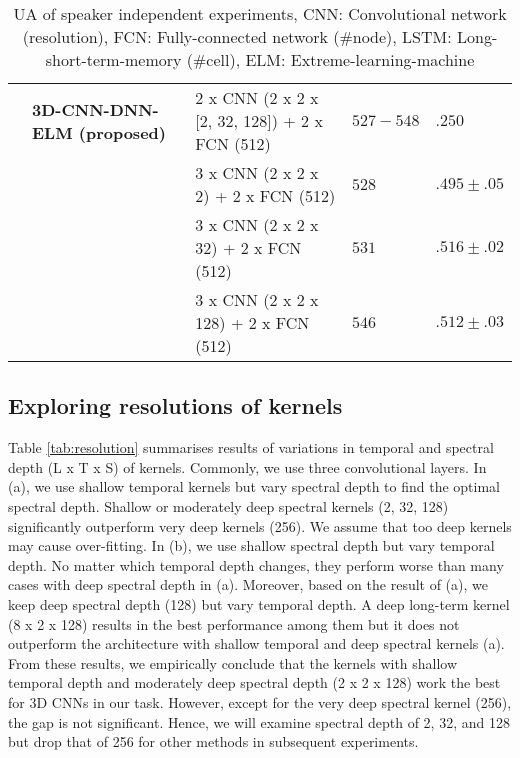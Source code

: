 \documentclass[conference, compsoc, twoside]{IEEEtran}
\begin{document}
\begin{table*}[!th]
\begin{tabular}{lllll}
        & \textbf{3D-CNN-DNN-ELM (proposed)}  & 2 x CNN (2 x 2 x [2, 32, 128]) + 2 x FCN (512) & $527 - 548$  & $.250$\\ 
        &       & 3 x CNN (2 x 2 x 2) + 2 x FCN (512) & $528$ & $.495\pm.05$\\
        &       & 3 x CNN (2 x 2 x 32) + 2 x FCN (512) & $531$  & $\mathbf{.516\pm.02}$\\
        &       & 3 x CNN (2 x 2 x 128) + 2 x FCN (512) & $546$  & $.512\pm.03$\\
\hline
\end{tabular}
\vspace{0.15cm}
\caption{UA of speaker independent experiments, CNN: Convolutional network (resolution), FCN: Fully-connected network (\#node), LSTM: Long-short-term-memory (\#cell), ELM: Extreme-learning-machine}\label{tab:comparison}
\end{table*}


\subsection{Exploring resolutions of kernels}
Table \ref{tab:resolution} summarises results of variations in temporal and spectral depth (L x T x S) of kernels. Commonly, we use three convolutional layers. In (a), we use shallow temporal kernels but vary spectral depth to find the optimal spectral depth. Shallow or moderately deep spectral kernels (2, 32, 128) significantly outperform very deep kernels (256). We assume that too deep kernels may cause over-fitting. In (b), we use shallow spectral depth but vary temporal depth. No matter which temporal depth changes, they perform worse than many cases with deep spectral depth in (a). Moreover, based on the result of (a), we keep deep spectral depth (128) but vary temporal depth. A deep long-term kernel (8 x 2 x 128) results in the best performance among them but it does not outperform the architecture with shallow temporal and deep spectral kernels (a). From these results, we empirically conclude that the kernels with shallow temporal depth and moderately deep spectral depth (2 x 2 x 128) work the best for 3D CNNs in our task. However, except for the very deep spectral kernel (256), the gap is not significant. Hence, we will examine spectral depth of 2, 32, and 128 but drop that of 256 for other methods in subsequent experiments.
\end{document}
